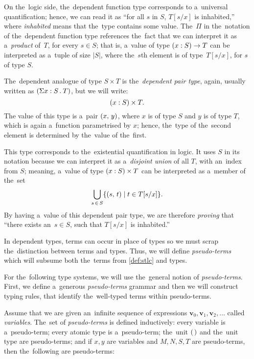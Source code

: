 On the~logic side, the~dependent function type corresponds to a~universal
quantification; hence, we can read it as ``for all $s$ in $S$, $T[s/x]$ is
inhabited,'' where \emph{inhabited} means that the~type contains some value.
The~$\Pi$ in the~notation of the~dependent function type references the~fact
that we can interpret it as a~\emph{product} of \,$T$, for every $s \in S$; that
is, a~value of type $(x : S) \to T$ can be interpreted as a~tuple of size $|S|$,
where the~$s$th element is of type \,$T[s/x]$, for $s$ of type $S$.

The~dependent analogue of type $S \times T$ is the~\emph{dependent pair type},
again, usually written as ${(\Sigma x \overset{}: S \, . \: T)}$, but we will write:
\[
  (x \overset{}: S) \times T.
\]
The value of this type is a~pair $(x, \, y)$, where $x$ is of type $S$ and $y$
is of type $T$, which is again a~function parametrised by $x$; hence, the~type
of the~second element is determined by the~value of the~first.

This type corresponds to the~existential quantification in logic. It uses $S$ in
its notation because we can interpret it as a~\emph{disjoint union} of all $T$,
with an~index from $S$; meaning, a~value of type $(x \overset{}: S) \times T$ can be
interpreted as a~member of the~set
\[
  \bigcup_{s \, \in \, S} \{ (s, \, t) \mid t \in T[s/x] \}.
\]
By having a~value of this dependent pair type, we are therefore \emph{proving}
that ``there exists an~$s \in S$, such that $T[s/x]$ is inhabited.''

In dependent types, terms can occur in place of types so we must scrap
the~distinction between terms and types. Thus, we will define
\emph{pseudo-terms} which will subsume both the~terms from \autoref{def:stlc}
and types.


For the~following type systems, we will use the~general notion of
\emph{pseudo-terms}. First, we define a~generous \emph{pseudo-terms} grammar and
then we will construct typing rules, that identify the~well-typed terms within
pseudo-terms.

\begin{definition}\label{def:pseudo-term}
  Assume that we are given an~infinite sequence of expressions $\mathbf{v}_0,
  \mathbf{v}_1, \mathbf{v}_2, \dots$ called \emph{variables}. The~set of
  \emph{pseudo-terms} is defined inductively: every variable is a~pseudo-term;
  every atomic type is a~pseudo-term; the~unit $( \, )$ and the~unit type \1 are
  pseudo-terms; and if $x, y$ are variables and $M, N, S, T$ are pseudo-terms,
  then the~following are pseudo-terms:
\end{definition}

